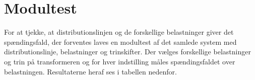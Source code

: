 
\section{Modultest}

For at tjekke, at distributionslinjen og de forskellige belastninger giver det spændingsfald, der forventes laves en modultest af det samlede system med distributionslinje, belastninger og trinskifter. Der vælges forskellige belastninger og trin på transformeren og for hver indstilling måles spændingsfaldet over belastningen. Resultaterne heraf ses i tabellen nedenfor. 